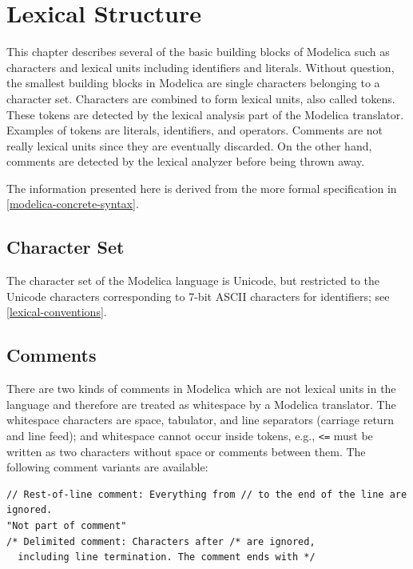 \chapter{Lexical Structure}\label{lexical-structure}

This chapter describes several of the basic building blocks of Modelica such as characters and lexical units including identifiers and literals.
Without question, the smallest building blocks in Modelica are single characters belonging to a character set.
Characters are combined to form lexical units, also called tokens.
These tokens are detected by the lexical analysis part of the Modelica translator.
Examples of tokens are literals, identifiers, and operators.
Comments are not really lexical units since they are eventually discarded.
On the other hand, comments are detected by the lexical analyzer before being thrown away.

The information presented here is derived from the more formal specification in \cref{modelica-concrete-syntax}.


\section{Character Set}\label{character-set}

The character set of the Modelica language is Unicode, but restricted to the Unicode characters corresponding to 7-bit ASCII characters for identifiers; see \cref{lexical-conventions}.


\section{Comments}\label{comments}

There are two kinds of comments in Modelica which are not lexical units in the language and therefore are treated as whitespace by a Modelica translator.
The whitespace characters are space, tabulator, and line separators (carriage return and line feed); and whitespace cannot occur inside tokens, e.g., \lstinline!<=! must be written as two characters without space or comments between them.
The following comment variants are available:
\begin{lstlisting}[language=modelica]
// Rest-of-line comment: Everything from // to the end of the line are ignored.
"Not part of comment"
/* Delimited comment: Characters after /* are ignored,
  including line termination. The comment ends with */
\end{lstlisting}

